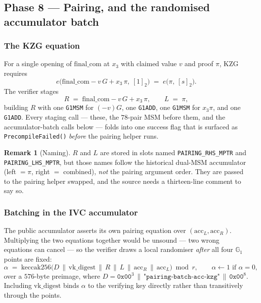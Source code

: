 \documentclass[11pt,a4paper]{article}
\newcommand{\Gone}{\ensuremath{\mathbb{G}_{1}}}
\newcommand{\pair}{\ensuremath{e}}
\newcommand{\code}[1]{\texttt{#1}}
\newcommand{\err}[1]{\textcolor{red!60!black}{\texttt{#1}}}
\newcommand{\mptr}[1]{\texttt{#1}}
\theoremstyle{definition}
\newtheorem{remark}{Remark}[section]
\begin{document}
\subsection{Phase 8 --- Pairing, and the randomised accumulator batch}
\label{sec:pairing}

\subsubsection{The KZG equation}

For a single opening of $\mathrm{final\_com}$ at $x_3$ with claimed value $v$
and proof $\pi$, KZG requires
\begin{equation}
\pair\big(\mathrm{final\_com} - v\,G + x_3\,\pi,\ [1]_2\big)
\;=\;
\pair\big(\pi,\ [s]_2\big).
\label{eq:kzg}
\end{equation}
The verifier stages
\begin{equation}
R \;=\; \mathrm{final\_com} - v\,G + x_3\,\pi,
\qquad
L \;=\; \pi,
\end{equation}
building $R$ with one \code{G1MSM} for $(-v)G$, one \code{G1ADD}, one
\code{G1MSM} for $x_3\pi$, and one \code{G1ADD}. Every staging call --- these,
the $78$-pair MSM before them, and the accumulator-batch calls below --- folds
into one success flag that is surfaced as \err{PrecompileFailed()}
\emph{before} the pairing helper runs.

\begin{remark}[Naming]
$R$ and $L$ are stored in slots named \mptr{PAIRING\_RHS\_MPTR} and
\mptr{PAIRING\_LHS\_MPTR}, but those names follow the historical dual-MSM
accumulator (left $=\pi$, right $=$ combined), \emph{not} the pairing argument
order. They are passed to the pairing helper swapped, and the source needs a
thirteen-line comment to say so.
\end{remark}

\subsubsection{Batching in the IVC accumulator}

The public accumulator asserts its own pairing equation over
$(\mathrm{acc}_L,\mathrm{acc}_R)$. Multiplying the two equations together
would be unsound --- two wrong equations can cancel --- so the verifier draws a
local randomiser \emph{after} all four $\Gone$ points are fixed:
\begin{equation}
\alpha \;=\;
\mathrm{keccak256}\big(
D \,\|\, \mathrm{vk\_digest} \,\|\, R \,\|\, L \,\|\, \mathrm{acc}_R \,\|\, \mathrm{acc}_L
\big) \bmod r,
\qquad
\alpha \leftarrow 1 \text{ if } \alpha = 0,
\label{eq:alpha}
\end{equation}
over a $576$-byte preimage, where
$D = \mathtt{0x00}^{3}\,\|\,\texttt{"pairing-batch-acc-kzg"}\,\|\,\mathtt{0x00}^{8}$.
Including $\mathrm{vk\_digest}$ binds $\alpha$ to the verifying key directly
rather than transitively through the points.
\end{document}
